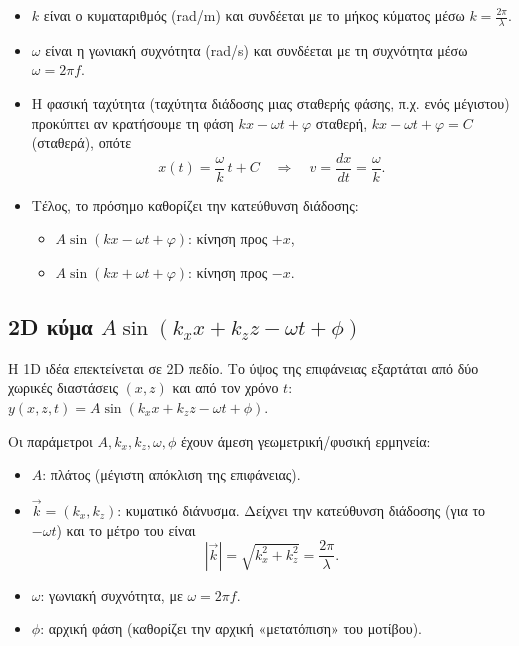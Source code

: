 \documentclass[a4paper, 11pt]{article}
\providecommand{\tightlist}{\setlength{\itemsep}{0pt}\setlength{\parskip}{0pt}}
\begin{document}
\begin{itemize}
\item
  \(k\) είναι ο κυματαριθμός (rad/m) και συνδέεται με το μήκος κύματος
  μέσω \(k=\frac{2\pi}{\lambda}\).
\item
  \(\omega\) είναι η γωνιακή συχνότητα (rad/s) και συνδέεται με τη
  συχνότητα μέσω \(\omega=2\pi f\).
\item
  Η φασική ταχύτητα (ταχύτητα διάδοσης μιας σταθερής φάσης, π.χ. ενός
  μέγιστου) προκύπτει αν κρατήσουμε τη φάση \(kx-\omega t+\varphi\)
  σταθερή, \(kx-\omega t+\varphi = C\) (σταθερά), οπότε \[
  x(t)=\frac{\omega}{k}\,t+C
  \quad\Rightarrow\quad
  v=\frac{dx}{dt}=\frac{\omega}{k}.
  \]
\item
  Τέλος, το πρόσημο καθορίζει την κατεύθυνση διάδοσης:

  \begin{itemize}
  \item
    \(A\sin(kx-\omega t+\varphi)\): κίνηση προς \(+x\),
  \item
    \(A\sin(kx+\omega t+\varphi)\): κίνηση προς \(-x\).
  \end{itemize}
\end{itemize}

\subsection{\texorpdfstring{2D κύμα
\(A\sin(k_x x + k_z z - \omega t + \phi)\)}{2D κύμα A\textbackslash sin(k\_x x + k\_z z - \textbackslash omega t + \textbackslash phi)}}\label{d-ux3baux3cdux3bcux3b1-asink_x-x-k_z-z---omega-t-phi}

Η 1D ιδέα επεκτείνεται σε 2D πεδίο. Το ύψος της επιφάνειας εξαρτάται από
δύο χωρικές διαστάσεις \((x,z)\) και από τον χρόνο \(t\):
\(y(x,z,t)=A\sin(k_x x + k_z z - \omega t + \phi)\).

Οι παράμετροι \(A, k_x, k_z, \omega, \phi\) έχουν άμεση
γεωμετρική/φυσική ερμηνεία:

\begin{itemize}
\tightlist
\item
  \(A\): πλάτος (μέγιστη απόκλιση της επιφάνειας).
\item
  \(\vec{k}=(k_x,k_z)\): κυματικό διάνυσμα. Δείχνει την κατεύθυνση
  διάδοσης (για το \(-\omega t\)) και το μέτρο του είναι \[
  |\vec{k}|=\sqrt{k_x^2+k_z^2}=\frac{2\pi}{\lambda}.
  \]
\item
  \(\omega\): γωνιακή συχνότητα, με \(\omega=2\pi f\).
\item
  \(\phi\): αρχική φάση (καθορίζει την αρχική «μετατόπιση» του μοτίβου).
\end{itemize}
\end{document}
